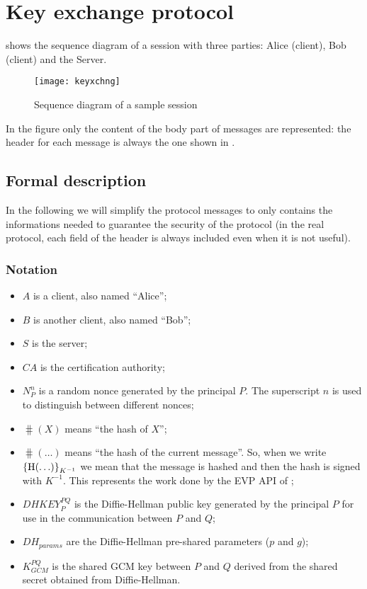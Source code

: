 \section{Key exchange protocol}\label{sec:keyxchng}

 shows the sequence diagram of a session with three
parties: Alice (client), Bob (client) and the Server.

\begin{figure}[htb]
	\texttt{[image: keyxchng]}
	\caption{Sequence diagram of a sample session}\label{fig:keyxchng}
\end{figure}

In the figure only the content of the body part of messages are represented: the
header for each message is always the one shown in .

\subsection{Formal description}\label{subsec:formal}

In the following we will simplify the protocol messages to only contains the
informations needed to guarantee the security of the protocol (in the real
protocol, each field of the header is always included even when it is not
useful).

\subsubsection{Notation}

\begin{itemize}
	\item \(A\) is a client, also named ``Alice'';
	\item \(B\) is another client, also named ``Bob'';
	\item \(S\) is the server;
	\item \(\mathit{CA}\) is the certification authority;
	\item \(N_P^n\) is a random nonce generated by the principal \(P\). The
		superscript \(n\) is used to distinguish between different
		nonces;
	\item \(\hash(X)\) means ``the hash of \(X\)'';
	\item \(\hash(\ldots)\) means ``the hash of the current message''. So,
		when we write \({\left\{\operatorname{H}(\ldots)\right\}}_{K^{-1}}\) we mean that the
		message is hashed and then the hash is signed with \(K^{-1}\).
		This represents the work done by the EVP API of \openssl;
	\item \(\mathit{DHKEY}_P^{PQ}\) is the Diffie-Hellman public key
		generated by the principal \(P\) for use in the communication
		between \(P\) and \(Q\);
	\item \(\mathit{DH}_{params}\) are the Diffie-Hellman pre-shared
		parameters (\(p\) and \(g\));
	\item \(K_{GCM}^{PQ}\) is the shared GCM key between \(P\) and \(Q\)
		derived from the shared secret obtained from Diffie-Hellman.
\end{itemize}

